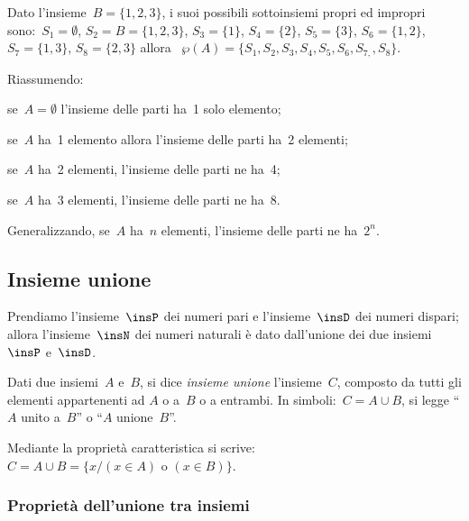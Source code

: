 \begin{esempio}
 Dato l'insieme~\(B=\{1,2,3\}\), i suoi possibili
sottoinsiemi propri ed impropri sono:~\(S_{1}=\emptyset\),
\(S_{2}=B=\{1,2,3\}\), \(S_{3}=\{1\}\), \(S_{4}=\{2\}\), \(S_{5}=\{3\}\),
\(S_{6}=\{1,2\}\), \(S_{7}=\{1,3\}\), \(S_{8}=\{2,3\}\)
allora~
\(\wp (A)=\{S_{1}, S_{2}, S_{3}, S_{4}, S_{5}, S_{6}, S_{7,}, S_{8}\}\).
 \end{esempio}

 Riassumendo:
\begin{itemize*}
\item se~\(A=\emptyset \) l'insieme delle parti ha~1 solo elemento;
\item se~\(A\) ha~1 elemento allora l'insieme delle parti ha~2 elementi;
\item se~\(A\) ha~2 elementi, l'insieme delle parti ne ha~4;
\item se~\(A\) ha~3 elementi, l'insieme delle parti ne ha~8.
\end{itemize*}

Generalizzando, se~\(A\) ha~\(n\) elementi, l'insieme delle parti ne 
ha~\(2^{n}\).


\subsection{Insieme unione}
\label{subsec:op_unione}

Prendiamo l'insieme~\(\insP\) dei numeri pari e l'insieme~\(\insD\) dei 
numeri dispari; allora l'insieme~\(\insN\) dei numeri naturali è dato 
dall'unione dei due insiemi~\(\insP\) e~\(\insD\).

\begin{definizione}
Dati due insiemi~\(A\) e~\(B\), si dice
\emph{insieme unione} l'insieme~\(C\), composto da tutti gli elementi 
appartenenti ad \(A\) o a~\(B\) o a entrambi.
In simboli:~\(C=A\cup B\), si legge ``\(A\) unito a~\(B\)''
o ``\(A\) unione~\(B\)''.
\end{definizione}
\begin{center}
 
\end{center}


Mediante la proprietà caratteristica si 
scrive:~\(C=A\cup B=\{x/(x\in A)\text{ o }(x\in B)\}\).

\subsubsection{Proprietà dell'unione tra insiemi}

